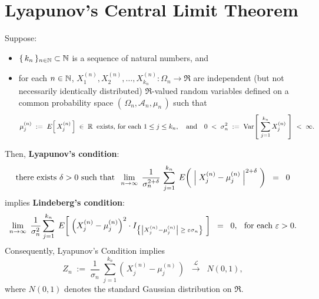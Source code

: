 
\section{Lyapunov's Central Limit Theorem}
\setcounter{theorem}{0}
\setcounter{equation}{0}

\begin{theorem}
\mbox{}\vskip 0.2cm
\noindent
Suppose:
\begin{itemize}
\item	$\{\,k_{n}\,\}_{n\in\mathbb{N}}\subset\mathbb{N}$ is a sequence of natural numbers, and %
\item	for each $n \in \mathbb{N}$, $X^{(n)}_{1}, X^{(n)}_{2}, \ldots, X^{(n)}_{k_{n}} : \Omega_{n} \longrightarrow \Re$
		are {\color{red}independent} (but not necessarily identically distributed)
		$\Re$-valued random variables defined on a common probability space
		$\left(\,\Omega_{n},\mathcal{A}_{n},\mu_{n}\,\right)$ such that
		\begin{equation*}
		\mu^{(n)}_{j} \;:=\; E\!\left[\,X^{(n)}_{j}\,\right] \;\in\; \mathbb{R} \;\;\textnormal{exists, for each $1 \leq j \leq k_{n}$},
		\quad\textnormal{and}\quad
		0 \;<\; \sigma^{2}_{n} \;:=\; \textnormal{Var}\!\left[\;\overset{k_{n}}{\underset{j=1}{\sum}}\,X^{(n)}_{j}\;\right] \;<\; \infty.
		\end{equation*}
\end{itemize}
Then, \textbf{Lyapunov's condition}:
\begin{equation*}
\textnormal{there exists $\delta > 0$ such that}
\;\;
\lim_{n\rightarrow\infty}\;
\dfrac{1}{\sigma^{2+\delta}_{n}}\,
\sum_{j=1}^{k_{n}}\;
E\!\left(\;
\left\vert\;X^{(n)}_{j} - \mu^{(n)}_{j}\;\right\vert^{2+\delta}
\;\right)
\;\;=\;\; 0
\end{equation*}
implies \textbf{Lindeberg's condition}:
\begin{equation*}
\lim_{n\rightarrow\infty}\;
\dfrac{1}{\sigma^{2}_{n}}
\sum_{j=1}^{k_{n}}\;
E\!\left[\;
\left(X^{(n)}_{j} - \mu^{(n)}_{j}\right)^{2}
\cdot
I_{\left\{\left\vert X^{(n)}_{j} - \mu^{(n)}_{j}\right\vert \;\geq\; \varepsilon \sigma_{n}\right\}}
\;\right]
\;\;=\;\;
0,
\;\;\,
\textnormal{for each $\varepsilon > 0$}.
\end{equation*}
Consequently, Lyapunov's Condition implies
\begin{equation*}
Z_{n} \; := \;
\dfrac{1}{\sigma_{n}}\;\sum^{k_{n}}_{j=1}\left(\,X^{(n)}_{j} - \mu^{(n)}_{j}\,\right)
\;\;\overset{\mathcal{L}}{\longrightarrow}\;\;
N(0,1),
\end{equation*}
where $N(0,1)$ denotes the standard Gaussian distribution on $\Re$.
\vskip 0.1cm
\noindent
\vskip 0.1cm
\noindent
\end{theorem}

